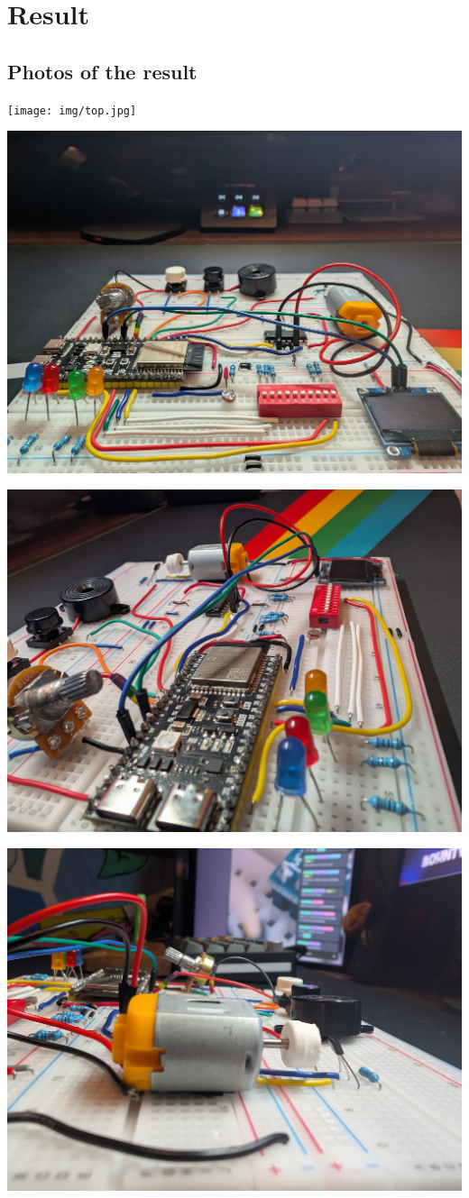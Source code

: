 \section{Result}
\graphicspath{ {./images/} }
\label{sec:result}

\subsection{Photos of the result}
\texttt{[image: img/top.jpg]}

\includegraphics[scale=0.05]{img/front.jpg}

\includegraphics[scale=0.05]{img/side.jpg}

\includegraphics[scale=0.05]{img/motor.jpg}
